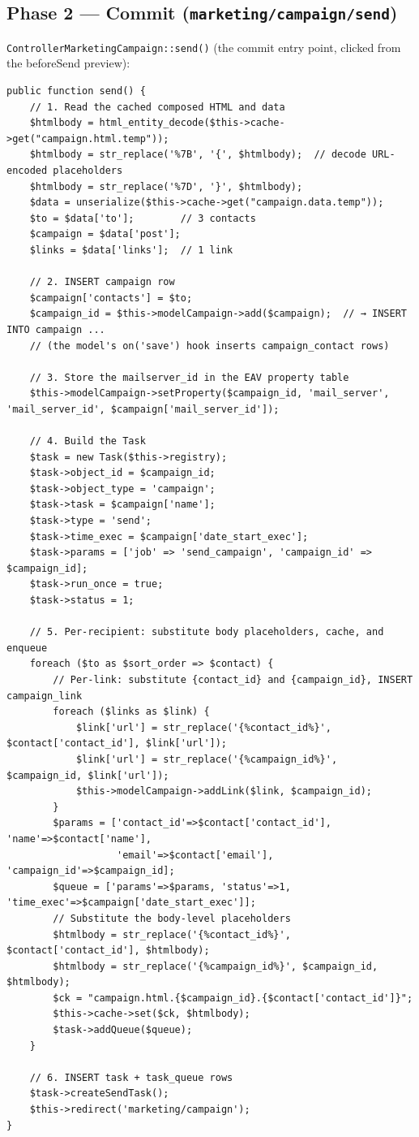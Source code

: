 \documentclass[11pt,a4paper]{article}
\begin{document}
\subsection{Phase 2 --- Commit (\texttt{marketing/campaign/send})}

\texttt{ControllerMarketingCampaign::send()} (the commit entry
point, clicked from the beforeSend preview):

\begin{lstlisting}[caption={\texttt{ControllerMarketingCampaign::send()} --- the commit phase (abridged).},label={lst:campaign-commit}]
public function send() {
    // 1. Read the cached composed HTML and data
    $htmlbody = html_entity_decode($this->cache->get("campaign.html.temp"));
    $htmlbody = str_replace('%7B', '{', $htmlbody);  // decode URL-encoded placeholders
    $htmlbody = str_replace('%7D', '}', $htmlbody);
    $data = unserialize($this->cache->get("campaign.data.temp"));
    $to = $data['to'];        // 3 contacts
    $campaign = $data['post'];
    $links = $data['links'];  // 1 link

    // 2. INSERT campaign row
    $campaign['contacts'] = $to;
    $campaign_id = $this->modelCampaign->add($campaign);  // → INSERT INTO campaign ...
    // (the model's on('save') hook inserts campaign_contact rows)

    // 3. Store the mailserver_id in the EAV property table
    $this->modelCampaign->setProperty($campaign_id, 'mail_server', 'mail_server_id', $campaign['mail_server_id']);

    // 4. Build the Task
    $task = new Task($this->registry);
    $task->object_id = $campaign_id;
    $task->object_type = 'campaign';
    $task->task = $campaign['name'];
    $task->type = 'send';
    $task->time_exec = $campaign['date_start_exec'];
    $task->params = ['job' => 'send_campaign', 'campaign_id' => $campaign_id];
    $task->run_once = true;
    $task->status = 1;

    // 5. Per-recipient: substitute body placeholders, cache, and enqueue
    foreach ($to as $sort_order => $contact) {
        // Per-link: substitute {contact_id} and {campaign_id}, INSERT campaign_link
        foreach ($links as $link) {
            $link['url'] = str_replace('{%contact_id%}', $contact['contact_id'], $link['url']);
            $link['url'] = str_replace('{%campaign_id%}', $campaign_id, $link['url']);
            $this->modelCampaign->addLink($link, $campaign_id);
        }
        $params = ['contact_id'=>$contact['contact_id'], 'name'=>$contact['name'],
                   'email'=>$contact['email'], 'campaign_id'=>$campaign_id];
        $queue = ['params'=>$params, 'status'=>1, 'time_exec'=>$campaign['date_start_exec']];
        // Substitute the body-level placeholders
        $htmlbody = str_replace('{%contact_id%}', $contact['contact_id'], $htmlbody);
        $htmlbody = str_replace('{%campaign_id%}', $campaign_id, $htmlbody);
        $ck = "campaign.html.{$campaign_id}.{$contact['contact_id']}";
        $this->cache->set($ck, $htmlbody);
        $task->addQueue($queue);
    }

    // 6. INSERT task + task_queue rows
    $task->createSendTask();
    $this->redirect('marketing/campaign');
}
\end{lstlisting}
\end{document}
